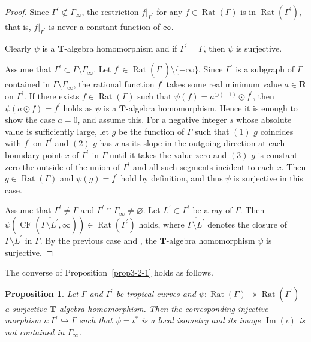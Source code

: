 \documentclass[a4paper,12pt]{amsart}
\newtheorem{prop}[dfn]{Proposition}
\def\Gamma{\varGamma}
\begin{document}
\begin{proof}
Since $\Gamma^{\prime} \not\subset \Gamma_{\infty}$, the restriction $f|_{\Gamma^{\prime}}$ for any $f \in \operatorname{Rat}(\Gamma)$ is in $\operatorname{Rat}(\Gamma^{\prime})$, that is, $f|_{\Gamma^{\prime}}$ is never a constant function of $\infty$.

Clearly $\psi$ is a $\boldsymbol{T}$-algebra homomorphism and if $\Gamma^{\prime} = \Gamma$, then $\psi$ is surjective.

Assume that $\Gamma^{\prime} \subset \Gamma \setminus \Gamma_{\infty}$.
Let $f^{\prime} \in \operatorname{Rat}(\Gamma^{\prime}) \setminus \{ -\infty \}$.
Since $\Gamma^{\prime}$ is a subgraph of $\Gamma$ contained in $\Gamma \setminus \Gamma_{\infty}$, the rational function $f^{\prime}$ takes some real minimum value $a \in \boldsymbol{R}$ on $\Gamma^{\prime}$.
If there exists $f \in \operatorname{Rat}(\Gamma)$ such that $\psi(f) = a^{\odot (-1)} \odot f^{\prime}$, then $\psi(a \odot f) = f^{\prime}$ holds as $\psi$ is a $\boldsymbol{T}$-algebra homomorphism.
Hence it is enough to show the case $a = 0$, and assume this.
For a negative integer $s$ whose absolute value is sufficiently large, let $g$ be the function of $\Gamma$ such that $(1)$ $g$ coincides with $f^{\prime}$ on $\Gamma^{\prime}$ and $(2)$ $g$ has $s$ as its slope in the outgoing direction at each boundary point $x$ of $\Gamma^{\prime}$ in $\Gamma$ until it takes the value zero and $(3)$ $g$ is constant zero the outside of the union of $\Gamma^{\prime}$ and all such segments incident to each $x$. 
Then $g \in \operatorname{Rat}(\Gamma)$ and $\psi(g) = f^{\prime}$ hold by definition, and thus $\psi$ is surjective in this case.

Assume that $\Gamma^{\prime} \not= \Gamma$ and $\Gamma^{\prime} \cap \Gamma_{\infty} \not= \varnothing$.
Let $L^{\prime} \subset \Gamma^{\prime}$ be a ray of $\Gamma$.
Then $\psi(\operatorname{CF}(\overline{\Gamma \setminus L^{\prime}}, \infty)) \in \operatorname{Rat}(\Gamma^{\prime})$ holds, where $\overline{\Gamma \setminus L^{\prime}}$ denotes the closure of $\Gamma \setminus L^{\prime}$ in $\Gamma$.
By the previous case and \cite[the proof of Lemma~1.4]{JuAe3}, the $\boldsymbol{T}$-algebra homomorphism $\psi$ is surjective.
\end{proof}

The converse of Proposition~\ref{prop3-2-1} holds as follows.

\begin{prop}
    \label{prop3-2-2}
Let $\Gamma$ and $\Gamma^{\prime}$ be tropical curves and $\psi : \operatorname{Rat}(\Gamma) \twoheadrightarrow \operatorname{Rat}(\Gamma^{\prime})$ a surjective $\boldsymbol{T}$-algebra homomorphism.
Then the corresponding injective morphism $\iota : \Gamma^{\prime} \hookrightarrow \Gamma$ such that $\psi = \iota^{\ast}$ is a local isometry and its image $\operatorname{Im}(\iota)$ is not contained in $\Gamma_{\infty}$.
\end{prop}
\end{document}
